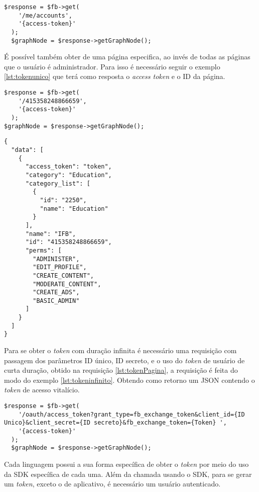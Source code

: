 \begin{lstlisting}[caption={Obtendo Token de acesso a página},label={lst:tokenPagina}]
  $response = $fb->get(
    '/me/accounts',
    '{access-token}'
  );
  $graphNode = $response->getGraphNode();
\end{lstlisting}

É possível também obter de uma página especifica, ao invés de todas as páginas que o usuário é administrador. Para isso é necessário seguir o exemplo \ref{lst:tokenunico} que terá como resposta o \textit{access token} e o ID da página.

\begin{lstlisting}[caption={Obtendo Token de uma única página},label={lst:tokenunico}]
  $response = $fb->get(
    '/415358248866659',
    '{access-token}'
  );
$graphNode = $response->getGraphNode();
\end{lstlisting}

\begin{lstlisting}[caption={Retorno \textit{token de acesso de página \ref{lst:tokenPagina}}},label={lst:retornoPagina}]
{
  "data": [
    {
      "access_token": "token",
      "category": "Education",
      "category_list": [
        {
          "id": "2250",
          "name": "Education"
        }
      ],
      "name": "IFB",
      "id": "415358248866659",
      "perms": [
        "ADMINISTER",
        "EDIT_PROFILE",
        "CREATE_CONTENT",
        "MODERATE_CONTENT",
        "CREATE_ADS",
        "BASIC_ADMIN"
      ]
    }
  ]
}
\end{lstlisting}

Para se obter o \textit{token} com duração infinita é necessário uma requisição com passagem dos parâmetros ID único, ID secreto, e o uso do \textit{token} de usuário de curta duração, obtido na requisição \ref{lst:tokenPagina}, a requisição é feita do modo do exemplo \ref{lst:tokeninfinito}. Obtendo como retorno um JSON contendo o \textit{token} de acesso vitalício.

\begin{lstlisting}[caption={Obtendo Token Infinito},label={lst:tokeninfinito}]
  $response = $fb->get(
    '/oauth/access_token?grant_type=fb_exchange_token&client_id={ID Unico}&client_secret={ID secreto}&fb_exchange_token={Token} ',
    '{access-token}'
  );
  $graphNode = $response->getGraphNode();
\end{lstlisting}

Cada linguagem possui a sua forma específica de obter o \textit{token} por meio do uso da SDK específica de cada uma. Além da chamada usando o SDK, para se gerar um \textit{token}, exceto o de aplicativo, é necessário um usuário autenticado.

